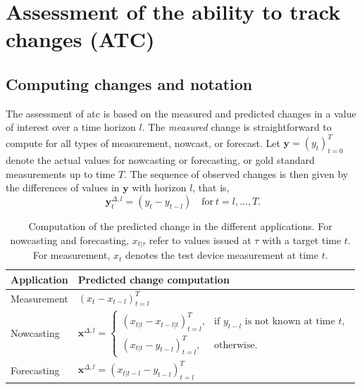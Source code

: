 \documentclass[pdflatex]{sn-jnl}
\theoremstyle{plain}%
\theoremstyle{definition}
\newcommand{\diffxl}{\mathbf{x}^{\Delta,l}}
\newcommand{\diffylt}{\mathbf{y}^{\Delta,l}_t}
\begin{document}
\section{Assessment of the ability to track changes (ATC)}\label{sec:aatc}

\subsection{Computing changes and notation}\label{subsec:notation}

The assessment of \ac{atc} is based on the measured and predicted changes in a value of interest over a time horizon $l$.
The \textit{measured} change is straightforward to compute for all types of measurement, nowcast, or forecast.
Let $\mathbf{y} = (y_t)_{t=0}^T$ denote the actual values for nowcasting or forecasting, or gold standard measurements up to time $T$.
The sequence of observed changes is then given by the differences of values in $\mathbf{y}$ with horizon $l$, that is,
\begin{equation}\label{eq:diffy}
    \diffylt = (y_{t} - y_{t-l}) \quad \text{for}\ t = l, \dots, T.
\end{equation}

\begin{table}
    \centering
    \scriptsize
    \begin{tabular}{l l}
        \toprule
        Application & Predicted change computation \\
        \midrule
        Measurement & $(x_{t} - x_{t-l})_{t=l}^T $\\
        Nowcasting & $
\diffxl =
\begin{cases}
(x_{t|t} - x_{t-l|t})^T_{t=l}, & \text{if } y_{t-l} \text{ is not known at time } t, \\
(x_{t|t} - y_{t-l})^T_{t=l}, & \text{otherwise}.
\end{cases}
$ \\
        Forecasting & $ \diffxl = (x_{t|t-l} - y_{t-l})^T_{t=l}$\\
        \bottomrule
    \end{tabular}
    \caption[Computation of the predicted change in the different applications.]{Computation of the predicted change in the different applications. For nowcasting and forecasting, $x_{t | \tau}$ refer to values issued at $\tau$ with a target time $t$. For measurement, $x_t$ denotes the test device measurement at time $t$.}
    \label{tab:notation}
\end{table}
\end{document}
